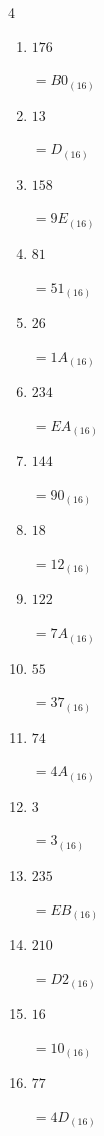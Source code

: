 \begin{multicols}{4}
\begin{enumerate}
        $=A8_{(16)}$

  \item $176$

        $=B0_{(16)}$

  \item $13$

        $=D_{(16)}$

  \item $158$

        $=9E_{(16)}$

  \item $81$

        $=51_{(16)}$

  \item $26$

        $=1A_{(16)}$

  \item $234$

        $=EA_{(16)}$

  \item $144$

        $=90_{(16)}$

  \item $18$

        $=12_{(16)}$

  \item $122$

        $=7A_{(16)}$

  \item $55$

        $=37_{(16)}$

  \item $74$

        $=4A_{(16)}$

  \item $3$

        $=3_{(16)}$

\columnbreak %

  \item $235$

        $=EB_{(16)}$

  \item $210$

        $=D2_{(16)}$

  \item $16$

        $=10_{(16)}$

  \item $77$

        $=4D_{(16)}$


\end{enumerate}
\end{multicols}
